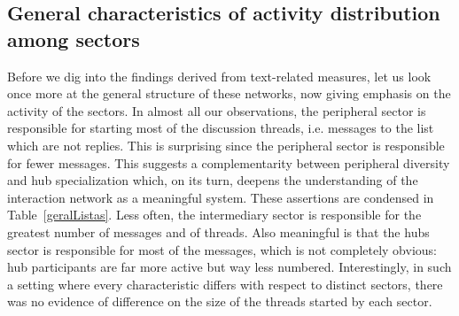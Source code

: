 \subsection{General characteristics of activity distribution among sectors}\label{sec:gen}
Before we dig into the findings derived from text-related measures,
let us look once more at the general structure of these networks,
now giving emphasis on the activity of the sectors.
In almost all our observations,
the peripheral sector is responsible for starting most of the discussion threads,
i.e. messages to the list which are not replies.
This is surprising since the peripheral sector is responsible for fewer messages.
This suggests a complementarity between peripheral diversity and hub specialization
which, on its turn, deepens the understanding of the interaction network as a meaningful system. 
These assertions are condensed in Table~\ref{geralListas}.
Less often, the intermediary sector is responsible for the greatest number of messages
and of threads.
Also meaningful is that the hubs sector is responsible for most of the messages,
which is not completely obvious: hub participants are far more active but way less numbered.
Interestingly, in such a setting where every characteristic differs with respect to
distinct sectors, there was no evidence of difference on the size of the threads started by each sector.



